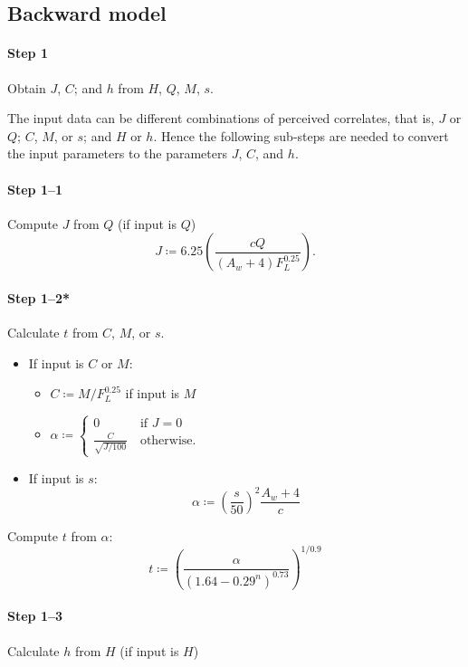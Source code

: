 \documentclass[twocolumn]{scrartcl}
\theoremstyle{named}
\begin{document}
\subsection{Backward model}

\paragraph{Step 1}{%
  Obtain $J$, $C$; and $h$ from $H$, $Q$, $M$, $s$.

  The input data can be different combinations of perceived correlates, that
  is, $J$ or $Q$; $C$, $M$, or $s$; and $H$ or $h$. Hence the following
  sub-steps are needed to convert the input parameters to the parameters $J$,
  $C$, and $h$.
  }


\paragraph{Step 1--1}{%
  Compute $J$ from $Q$ (if input is $Q$)
  \[
    J\coloneqq 6.25 \left(\frac{cQ}{(A_w+4) F_L^{0.25}}\right).
    \]}

\paragraph{Step 1--2*}{%
Calculate $t$ from $C$, $M$, or $s$.

\begin{itemize}

  \item If input is $C$ or $M$:
    \begin{itemize}
      \item $C\coloneqq M / F_L^{0.25}$ if input is $M$
      \item $\alpha\coloneqq\begin{cases}
          0 &\:\text{if $J=0$}\\
          \frac{C}{\sqrt{J/100}}&\:\text{otherwise}.
      \end{cases}$
    \end{itemize}
  \item If input is $s$:
    \[
    \alpha \coloneqq {\left(\frac{s}{50}\right)}^2 \frac{A_w+4}{c}
    \]
\end{itemize}
Compute $t$ from $\alpha$:
\[
  t \coloneqq {\left(\frac{\alpha}{{(1.64 - 0.29^n)}^{0.73}}\right)}^{1/0.9}
\]
}

\paragraph{Step 1--3}{%
  Calculate $h$ from $H$ (if input is $H$)
}
\end{document}
